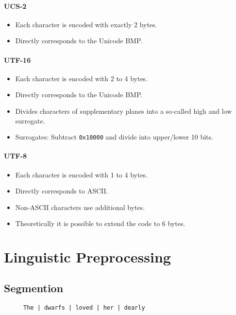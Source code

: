 			\subsubsection{UCS-2} %
				\begin{itemize}
					\item Each character is encoded with exactly 2 bytes.
					\item Directly corresponds to the Unicode BMP.
				\end{itemize}

			\subsubsection{UTF-16} %
				\begin{itemize}
					\item Each character is encoded with 2 to 4 bytes.
					\item Directly corresponds to the Unicode BMP.
					\item Divides characters of supplementary planes into a so-called high and low surrogate.
					\item Surrogates: Subtract \texttt{0x10000} and divide into upper/lower 10 bits.
				\end{itemize}

			\subsubsection{UTF-8} %
				\begin{itemize}
					\item Each character is encoded with 1 to 4 bytes.
					\item Directly corresponds to ASCII.
					\item Non-ASCII characters use additional bytes.
					\item Theoretically it is possible to extend the code to 6 bytes.
				\end{itemize}

\chapter{Linguistic Preprocessing} %
	\label{c:linguisticpreprocessing}

	\section{Segmention} %
		\begin{figure}[H]
			\centering
			\texttt{The | dwarfs | loved | her | dearly}
		\end{figure}

